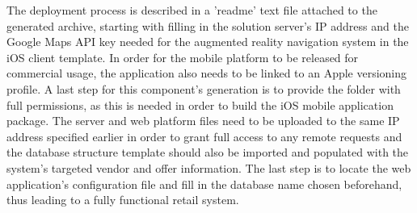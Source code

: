 The deployment process is described in a 'readme' text file attached to the generated archive, starting with filling in the solution server's IP address and the Google Maps API key needed for the augmented reality navigation system in the iOS client template. In order for the mobile platform to be released for commercial usage, the application also needs to be linked to an Apple versioning profile. A last step for this component's generation is to provide the folder with full permissions, as this is needed in order to build the iOS mobile application package. The server and web platform files need to be uploaded to the same IP address specified earlier in order to grant full access to any remote requests and the database structure template should also be imported and populated with the system's targeted vendor and offer information. The last step is to locate the web application's configuration file and fill in the database name chosen beforehand, thus leading to a fully functional retail system.\\



